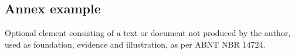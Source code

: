 \begin{anexosenv}

\partanexos

\chapter{Annex example}
Optional element consisting of a text or document not produced by the author, used as foundation, evidence and illustration, as per ABNT NBR 14724.

\end{anexosenv}
